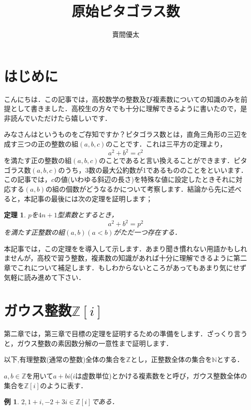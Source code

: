 \documentclass[dvipdfmx]{jsarticle}
\newtheorem*{theorem*}{定理}
\newtheorem{example}{例}
\begin{document}
\title{原始ピタゴラス数}
\date{}
\author{賣間優太}
\maketitle




\section{はじめに}

こんにちは．この記事では，高校数学の整数及び複素数についての知識のみを前提として書きました．高校生の方々でも十分に理解できるように書いたので，是非読んでいただけたら嬉しいです．

みなさんはというものをご存知ですか？ピタゴラス数とは，直角三角形の三辺を成す三つの正の整数の組$(a,b,c)$のことです．これは三平方の定理より，
$$a^2+b^2=c^2$$
を満たす正の整数の組$(a,b,c)$のことであると言い換えることができます．ピタゴラス数$(a,b,c)$のうち，3数の最大公約数が1であるもののことをといいます．
この記事では，$c$の値(いわゆる斜辺の長さ)を特殊な値に設定したときそれに対応する$(a,b)$の組の個数がどうなるかについて考察します．結論から先に述べると，本記事の最後には次の定理を証明します；

\begin{screen}
\begin{theorem*}
$p$を$4n+1$型素数とするとき，
$$a^2+b^2=p^{2}$$
を満たす正整数の組$(a,b)(a<b)$がただ一つ存在する．
\end{theorem*}
\end{screen}
本記事では，この定理をを導入して示します．あまり聞き慣れない用語かもしれませんが，高校で習う整数，複素数の知識があれば十分に理解できるように第二章でこれについて補足します．もしわからないところがあってもあまり気にせず気軽に読み進めて下さい．


\clearpage


\section{ガウス整数$\mathbb{Z}[i]$}
第二章では，第三章で目標の定理を証明するための準備をします．ざっくり言うと，ガウス整数の素因数分解の一意性まで証明します．

以下,有理整数(通常の整数)全体の集合を$\mathbb{Z}$とし，正整数全体の集合を$\mathbb{N}$とする．

$a,b\in\mathbb{Z}$を用いて$a+bi$($i$は虚数単位)とかける複素数をと呼び，ガウス整数全体の集合を$\mathbb{Z}[i]$のように表す．
\begin{example}
$2,1+i,-2+3i\in\mathbb{Z}[i]$である．
\end{example}
\end{document}
